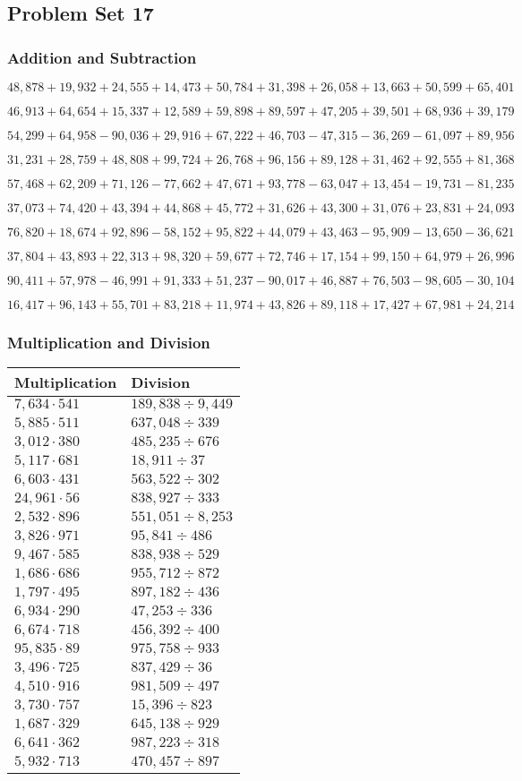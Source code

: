 \hypertarget{problem-set-17-4}{%
\subsection{Problem Set 17}\label{problem-set-17-4}}

\hypertarget{addition-and-subtraction-239}{%
\subsubsection{Addition and
Subtraction}\label{addition-and-subtraction-239}}

\(48,878+19,932+24,555+14,473+50,784+31,398+26,058+13,663+50,599+ 65,401\)

\(46,913+64,654+15,337+12,589+59,898+89,597+47,205+39,501+68,936+39,179\)

\(54,299+64,958-90,036+29,916+67,222+46,703-47,315-36,269-61,097+89,956\)

\(31,231+28,759+48,808+99,724+26,768+96,156+89,128+31,462+92,555+81,368\)

\(57,468+62,209+71,126-77,662+47,671+93,778-63,047+13,454-19,731-81,235\)

\(37,073+74,420+43,394+44,868+45,772+31,626+43,300+31,076+23,831+24,093\)

\(76,820+18,674+92,896-58,152+95,822+44,079+43,463-95,909-13,650-36,621\)

\(37,804+43,893+22,313+98,320+59,677+72,746+17,154+99,150+64,979+26,996\)

\(90,411+57,978-46,991+91,333+51,237-90,017+46,887+76,503-98,605-30,104\)

\(16,417+96,143+55,701+83,218+11,974+43,826+89,118+17,427+67,981+24,214\)

\hypertarget{multiplication-and-division-238}{%
\subsubsection{Multiplication and
Division}\label{multiplication-and-division-238}}

\begin{longtable}[]{@{}ll@{}}
\toprule
Multiplication & Division\tabularnewline
\midrule
\endhead
\(7,634\cdot541\) & \(189,838÷9,449\)\tabularnewline
\(5,885\cdot511\) & \(637,048÷339\)\tabularnewline
\(3,012\cdot380\) & \(485,235÷676\)\tabularnewline
\(5,117\cdot681\) & \(18,911÷37\)\tabularnewline
\(6,603\cdot431\) & \(563,522÷302\)\tabularnewline
\(24,961\cdot56\) & \(838,927÷333\)\tabularnewline
\(2,532\cdot896\) & \(551,051÷8,253\)\tabularnewline
\(3,826\cdot971\) & \(95,841÷486\)\tabularnewline
\(9,467\cdot585\) & \(838,938÷529\)\tabularnewline
\(1,686\cdot686\) & \(955,712÷872\)\tabularnewline
\(1,797\cdot495\) & \(897,182÷436\)\tabularnewline
\(6,934\cdot290\) & \(47,253÷336\)\tabularnewline
\(6,674\cdot718\) & \(456,392÷400\)\tabularnewline
\(95,835\cdot89\) & \(975,758÷933\)\tabularnewline
\(3,496\cdot725\) & \(837,429÷36\)\tabularnewline
\(4,510\cdot916\) & \(981,509÷497\)\tabularnewline
\(3,730\cdot757\) & \(15,396÷823\)\tabularnewline
\(1,687\cdot329\) & \(645,138÷929\)\tabularnewline
\(6,641\cdot362\) & \(987,223÷318\)\tabularnewline
\(5,932\cdot713\) & \(470,457÷897\)\tabularnewline
\bottomrule
\end{longtable}

